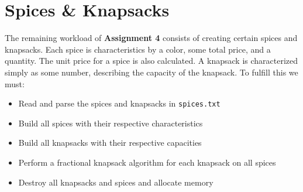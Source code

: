 \documentclass[12pt, letterpaper]{article}
\begin{document}
\section{Spices \& Knapsacks} \label{SpiceKnapsack}
The remaining workload of \textbf{Assignment 4} consists of creating certain spices and knapsacks.
Each spice is characteristics by a color, some total price, and a quantity.
The unit price for a spice is also calculated.
A knapsack is characterized simply as some number, describing the capacity of the knapsack.
\vspace*{5px}
\newline
To fulfill this we must:
\begin{itemize}
   \item Read and parse the spices and knapsacks in \texttt{spices.txt}
   \item Build all spices with their respective characteristics
   \item Build all knapsacks with their respective capacities
   \item Perform a fractional knapsack algorithm for each knapsack on all spices
   \item Destroy all knapsacks and spices and allocate memory
\end{itemize}
\end{document}
